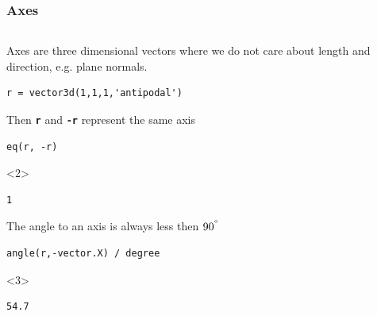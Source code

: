\documentclass[compress]{beamer}
\begin{document}
\begin{frame}[fragile]
  \frametitle{Axes}

  \begin{columns}
    \begin{column}{8.5cm}
      \begin{overlayarea}{8.5cm}{8cm}
        Axes are three dimensional vectors where we do not care about length and
        direction, e.g. plane normals.

\begin{lstlisting}[style=input]
r = vector3d(1,1,1,'antipodal')
\end{lstlisting}

\medskip
\pause

Then \textbf{\texttt{r}} and \textbf{\texttt{-r}} represent the same axis
\begin{lstlisting}[style=input]
eq(r, -r)
\end{lstlisting}
\begin{onlyenv}<2>
  \vspace{-0.3cm}
\begin{lstlisting}[style=output]
  1
\end{lstlisting}
\end{onlyenv}

\medskip
\pause

The angle to an axis is always less then $90^{^\circ}$
\begin{lstlisting}[style=input]
angle(r,-vector.X) / degree
\end{lstlisting}
\begin{onlyenv}<3>
  \vspace{-0.3cm}
\begin{lstlisting}[style=output]
  54.7
\end{lstlisting}
\end{onlyenv}

\medskip
\pause


\end{overlayarea}
\end{column}
\end{columns}
\end{frame}
\end{document}
